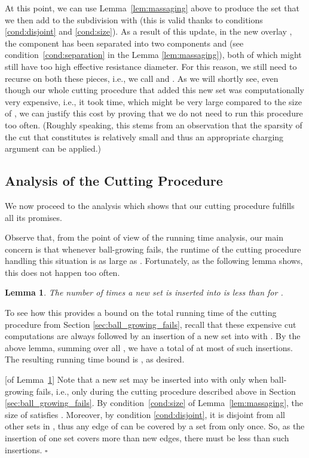 \documentclass[11pt, letterpaper]{article}
\newtheorem{lemma}[theorem]{Lemma}
\newenvironment{proof}{\noindent{\bf Proof:}\hspace*{1em}}{\qed\bigskip}
\newcommand{\qed}{\hfill\ensuremath{\square}}
\begin{document}
At this point, we can use Lemma~\ref{lem:massaging} above to produce the set  that we then add to the subdivision  with  (this is valid thanks to conditions \eqref{cond:disjoint} and \eqref{cond:size}).
As a result of this update, in the new overlay , the component  has been separated into two components  and  (see condition~\eqref{cond:separation} in the Lemma \ref{lem:massaging}), both of which might still have too high effective resistance diameter. For this reason, we still need to recurse on both these pieces, i.e., we call  and . As we will shortly see, even though our whole cutting procedure that added this new set  was computationally very expensive, i.e., it took  time, which might be very large compared to the size of , we can justify this cost by proving that we do not need to run this procedure too often. (Roughly speaking, this stems from an observation that the sparsity of the cut that  constitutes is relatively small and thus an appropriate charging argument can be applied.)

\subsection{Analysis of the Cutting Procedure}

We now proceed to the analysis which shows that our cutting procedure fulfills all its promises.

Observe that, from the point of view of the running time analysis, our main concern is that whenever ball-growing fails, the runtime of the cutting procedure handling this situation is as large as . Fortunately, as the following lemma shows, this does not happen too often. 

\begin{lemma} \label{lem:number_of_insertions}
The number of times a new set is inserted into  is less than  for .
\label{lem:number_of_insertions_of_set}
\end{lemma}

To see how this provides a bound on the total running time of the cutting procedure from Section \ref{sec:ball_growing_fails}, recall that these expensive cut computations are always followed by an insertion of a new set into  with . By the above lemma, summing over all , we have a total of at most  of such insertions. The resulting running time bound is , as desired.

\begin{proof}[of Lemma~\ref{lem:number_of_insertions}]
Note that a new set  may be inserted into  with  only when ball-growing fails, i.e., only during the cutting procedure described above in Section \ref{sec:ball_growing_fails}. By condition~\eqref{cond:size} of Lemma~\ref{lem:massaging}, the size of  satisfies . Moreover, by condition \eqref{cond:disjoint}, it is disjoint from all other sets in , thus any edge of  can be covered by a set from  only once. So, as the insertion of one set  covers more than  new edges, there must be less than  such insertions.
\end{proof}
\end{document}
